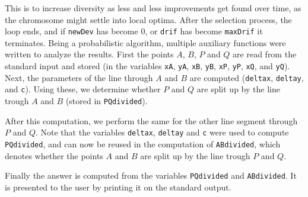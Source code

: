 \documentclass[a4paper,10pt]{article}
\begin{document}
This is to increase diversity as less and less improvements get found over time, as the chromosome might settle into local optima.
After the selection process, the loop ends, and if {\tt newDev} has become 0, or {\tt drif} has become {\tt maxDrif} it terminates.
\newline
\newline
Being a probabilistic algorithm, multiple auxiliary functions were written to analyze the results.
\newline
\newline
First the points $A$, $B$, $P$ and $Q$ are read from the standard input and stored (in the variables {\tt xA}, {\tt yA}, {\tt xB}, {\tt yB}, {\tt xP}, {\tt yP}, {\tt xQ}, and {\tt yQ}). 
Next, the parameters of the line through $A$ and $B$ are computed ({\tt deltax}, {\tt deltay}, and {\tt c}). Using these, we determine whether $P$ and $Q$ are split up by the line trough $A$ and $B$ (stored in {\tt PQdivided}).


After this computation, we perform the same for the other line segment through $P$ and $Q$.
Note that the variables {\tt deltax}, {\tt deltay} and {\tt c} were used to compute {\tt PQdivided}, and can now be reused in the computation of {\tt ABdivided}, which denotes 
whether the points $A$ and $B$ are split up by the line trough $P$ and $Q$.

Finally the answer is computed from the variables  {\tt PQdivided} and {\tt ABdivided}.
It is presented to the user by printing it on the standard output.
\end{document}

